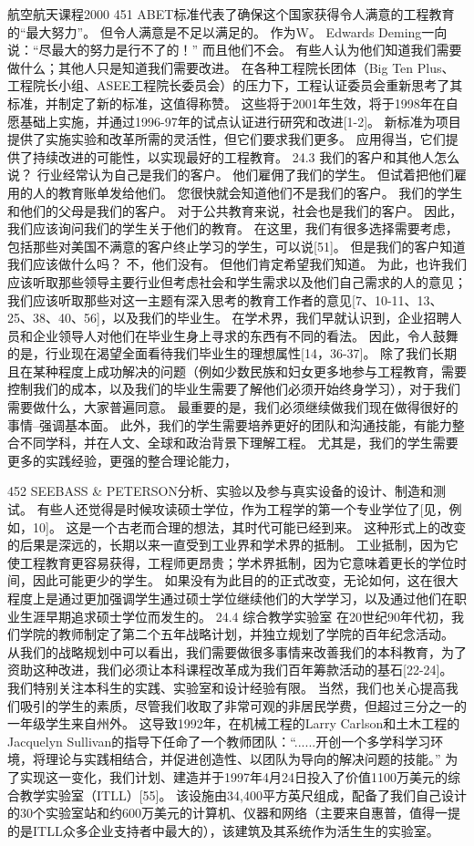 \documentclass[UTF8,11pt,a4paper,openany,fontset=fandol]{ctexbook}
\begin{document}
航空航天课程2000 451 ABET标准代表了确保这个国家获得令人满意的工程教育的“最大努力”。 但令人满意是不足以满足的。 作为W。 Edwards Deming一向说：“尽最大的努力是行不了的！” 而且他们不会。 有些人认为他们知道我们需要做什么；其他人只是知道我们需要改进。 在各种工程院长团体（Big Ten Plus、工程院长小组、ASEE工程院长委员会）的压力下，工程认证委员会重新思考了其标准，并制定了新的标准，这值得称赞。 这些将于2001年生效，将于1998年在自愿基础上实施，并通过1996-97年的试点认证进行研究和改进[1-2]。 新标准为项目提供了实施实验和改革所需的灵活性，但它们要求我们更多。 应用得当，它们提供了持续改进的可能性，以实现最好的工程教育。 24.3 我们的客户和其他人怎么说？ 行业经常认为自己是我们的客户。 他们雇佣了我们的学生。 但试着把他们雇用的人的教育账单发给他们。 您很快就会知道他们不是我们的客户。 我们的学生和他们的父母是我们的客户。 对于公共教育来说，社会也是我们的客户。 因此，我们应该询问我们的学生关于他们的教育。 在这里，我们有很多选择需要考虑，包括那些对美国不满意的客户终止学习的学生，可以说[51]。 但是我们的客户知道我们应该做什么吗？ 不，他们没有。 但他们肯定希望我们知道。 为此，也许我们应该听取那些领导主要行业但考虑社会和学生需求以及他们自己需求的人的意见；我们应该听取那些对这一主题有深入思考的教育工作者的意见[7、10-11、13、25、38、40、56]，以及我们的毕业生。 在学术界，我们早就认识到，企业招聘人员和企业领导人对他们在毕业生身上寻求的东西有不同的看法。 因此，令人鼓舞的是，行业现在渴望全面看待我们毕业生的理想属性[14，36-37]。 除了我们长期且在某种程度上成功解决的问题（例如少数民族和妇女更多地参与工程教育，需要控制我们的成本，以及我们的毕业生需要了解他们必须开始终身学习），对于我们需要做什么，大家普遍同意。 最重要的是，我们必须继续做我们现在做得很好的事情--强调基本面。 此外，我们的学生需要培养更好的团队和沟通技能，有能力整合不同学科，并在人文、全球和政治背景下理解工程。 尤其是，我们的学生需要更多的实践经验，更强的整合理论能力，

452 SEEBASS \& PETERSON分析、实验以及参与真实设备的设计、制造和测试。 有些人还觉得是时候攻读硕士学位，作为工程学的第一个专业学位了[见，例如，10]。 这是一个古老而合理的想法，其时代可能已经到来。 这种形式上的改变的后果是深远的，长期以来一直受到工业界和学术界的抵制。 工业抵制，因为它使工程教育更容易获得，工程师更昂贵；学术界抵制，因为它意味着更长的学位时间，因此可能更少的学生。 如果没有为此目的的正式改变，无论如何，这在很大程度上是通过更加强调学生通过硕士学位继续他们的大学学习，以及通过他们在职业生涯早期追求硕士学位而发生的。 24.4 综合教学实验室 在20世纪90年代初，我们学院的教师制定了第二个五年战略计划，并独立规划了学院的百年纪念活动。 从我们的战略规划中可以看出，我们需要做很多事情来改善我们的本科教育，为了资助这种改进，我们必须让本科课程改革成为我们百年筹款活动的基石[22-24]。 我们特别关注本科生的实践、实验室和设计经验有限。 当然，我们也关心提高我们吸引的学生的素质，尽管我们收取了非常可观的非居民学费，但超过三分之一的一年级学生来自州外。 这导致1992年，在机械工程的Larry Carlson和土木工程的Jacquelyn Sullivan的指导下任命了一个教师团队：“......开创一个多学科学习环境，将理论与实践相结合，并促进创造性、以团队为导向的解决问题的技能。” 为了实现这一变化，我们计划、建造并于1997年4月24日投入了价值1100万美元的综合教学实验室（ITLL）[55]。 该设施由34,400平方英尺组成，配备了我们自己设计的30个实验室站和约600万美元的计算机、仪器和网络（主要来自惠普，值得一提的是ITLL众多企业支持者中最大的），该建筑及其系统作为活生生的实验室。
\end{document}
